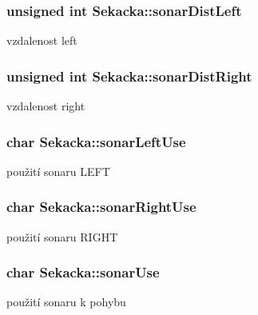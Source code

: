\subsubsection[{\texorpdfstring{sonar\+Dist\+Left}{sonarDistLeft}}]{\setlength{\rightskip}{0pt plus 5cm}unsigned int Sekacka\+::sonar\+Dist\+Left\hspace{0.3cm}{\ttfamily [private]}}\hypertarget{class_sekacka_ab7bdf6c96058d419c7d98b02893df638}{}\label{class_sekacka_ab7bdf6c96058d419c7d98b02893df638}
vzdalenost left 
\subsubsection[{\texorpdfstring{sonar\+Dist\+Right}{sonarDistRight}}]{\setlength{\rightskip}{0pt plus 5cm}unsigned int Sekacka\+::sonar\+Dist\+Right\hspace{0.3cm}{\ttfamily [private]}}\hypertarget{class_sekacka_a207ffc8368c5d5fe4d43efeed0c924d0}{}\label{class_sekacka_a207ffc8368c5d5fe4d43efeed0c924d0}
vzdalenost right 
\subsubsection[{\texorpdfstring{sonar\+Left\+Use}{sonarLeftUse}}]{\setlength{\rightskip}{0pt plus 5cm}char Sekacka\+::sonar\+Left\+Use\hspace{0.3cm}{\ttfamily [private]}}\hypertarget{class_sekacka_a78af23ffa04ade64990fa72c8ae10543}{}\label{class_sekacka_a78af23ffa04ade64990fa72c8ae10543}
použití sonaru L\+E\+FT 
\subsubsection[{\texorpdfstring{sonar\+Right\+Use}{sonarRightUse}}]{\setlength{\rightskip}{0pt plus 5cm}char Sekacka\+::sonar\+Right\+Use\hspace{0.3cm}{\ttfamily [private]}}\hypertarget{class_sekacka_a742636442a58009b65d5ddfce21333b8}{}\label{class_sekacka_a742636442a58009b65d5ddfce21333b8}
použití sonaru R\+I\+G\+HT 
\subsubsection[{\texorpdfstring{sonar\+Use}{sonarUse}}]{\setlength{\rightskip}{0pt plus 5cm}char Sekacka\+::sonar\+Use\hspace{0.3cm}{\ttfamily [private]}}\hypertarget{class_sekacka_a64d54c86f397f9c2bf469dabb8d82176}{}\label{class_sekacka_a64d54c86f397f9c2bf469dabb8d82176}
použití sonaru k pohybu 
